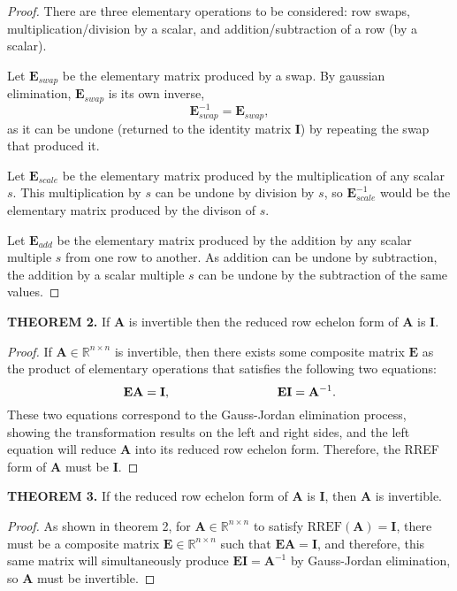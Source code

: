 \documentclass[12pt]{article}
\newcommand{\mat}[1]{\mathbf{#1}}
\newcommand{\theorem}[2]{\textbf{THEOREM #1.} #2}
\newcommand{\rref}{\text{RREF}}
\begin{document}
\begin{proof}
There are three elementary operations to be considered: row swaps, multiplication/division by a scalar, and addition/subtraction of a row (by a scalar). 

Let $\mat{E}_{swap}$ be the elementary matrix produced by a swap. By gaussian elimination, $\mat{E}_{swap}$ is its own inverse,
$$\mat{E}_{swap}^{-1} = \mat{E}_{swap},$$
as it can be undone (returned to the identity matrix $\mat{I}$) by repeating the swap that produced it. 

Let $\mat{E}_{scale}$ be the elementary matrix produced by the multiplication of any scalar $s$. This multiplication by $s$ can be undone by division by $s$, so $\mat{E}^{-1}_{scale}$ would be the elementary matrix produced by the divison of $s$. 

Let $\mat{E}_{add}$ be the elementary matrix produced by the addition by any scalar multiple $s$ from one row to another. As addition can be undone by subtraction, the addition by a scalar multiple $s$ can be undone by the subtraction of the same values.
\end{proof}

\theorem{2}{If $\mat{A}$ is invertible then the reduced row echelon form of $\mat{A}$ is $\mat{I}$.}

\begin{proof}
If $\mat{A} \in \mathbb{R}^{n \times n}$ is invertible, then there exists some composite matrix $\mat{E}$ as the product of elementary operations that satisfies the following two equations:
\begin{equation*}
\mat{EA} = \mat{I}, \hspace{0.25\textwidth} \mat{EI} = \mat{A}^{-1}.
\end{equation*}
These two equations correspond to the Gauss-Jordan elimination process, showing the transformation results on the left and right sides, and the left equation will reduce $\mat{A}$ into its reduced row echelon form. Therefore, the RREF form of $\mat{A}$ must be $\mat{I}$.
\end{proof}

\theorem{3}{If the reduced row echelon form of $\mat{A}$ is $\mat{I}$, then $\mat{A}$ is invertible.}

\begin{proof}
As shown in theorem 2, for $\mat{A} \in \mathbb{R}^{n \times n}$ to satisfy $\rref(\mat{A}) = \mat{I}$, there must be a composite matrix $\mat{E} \in \mathbb{R}^{n \times n}$ such that $\mat{EA} = \mat{I}$, and therefore, this same matrix will simultaneously produce $\mat{EI} = \mat{A}^{-1}$ by Gauss-Jordan elimination, so $\mat{A}$ must be invertible.
\end{proof}
\end{document}
